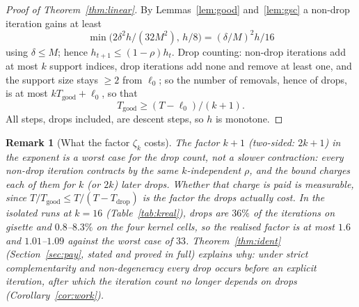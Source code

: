 \documentclass[pdflatex,sn-apa]{sn-jnl}%
\newtheorem{remark}[theorem]{Remark}
\theoremstyle{thmstyleone}
\theoremstyle{thmstyletwo}
\newtheorem{remark}[theorem]{Remark}
\begin{document}
\begin{proof}[Proof of Theorem~\ref{thm:linear}]
By Lemmas~\ref{lem:good} and~\ref{lem:gsc} a non-drop iteration gains
at least
\[\min\big(2\delta^2h/(32M^2),\,h/8\big)=(\delta/M)^2h/16\]
using $\delta\le M$; hence $h_{t+1}\le(1-\rho)h_t$. Drop counting:
non-drop
iterations add at most $k$ support indices, drop iterations add none
and remove at least one, and the support size stays $\ge2$ from $\ell_0$;
so the number of removals, hence of drops, is at most
$kT_{\mathrm{good}}+\ell_0$, so that
\[T_{\mathrm{good}}\ge(T-\ell_0)/(k+1).\]
All steps, drops included, are descent steps, so $h$ is monotone.
\end{proof}
\begin{remark}[What the factor $\zeta_k$ costs]\label{rem:zeta}
The factor $k+1$ (two-sided: $2k+1$) in the exponent is a worst case for
the drop count, not a slower contraction: every non-drop iteration
contracts by the same $k$-independent $\rho$, and the bound charges each
of them for $k$ (or $2k$) later drops. Whether that charge is paid is
measurable, since $T/T_{\mathrm{good}}\le T/(T-T_{\mathrm{drop}})$ is the
factor the drops actually cost. In the isolated runs at $k{=}16$
(Table~\ref{tab:kreal}), drops are $36\%$ of the iterations on gisette
and $0.8$--$8.3\%$ on the four kernel cells, so the realised factor is at
most $1.6$ and $1.01$--$1.09$ against the worst case of $33$.
Theorem~\ref{thm:ident} (Section~\ref{sec:pay}, stated and proved in
full) explains why: under strict complementarity and non-degeneracy
every drop occurs before an explicit iteration, after which the
iteration count no longer depends on drops (Corollary~\ref{cor:work}).
\end{remark}
\end{document}
